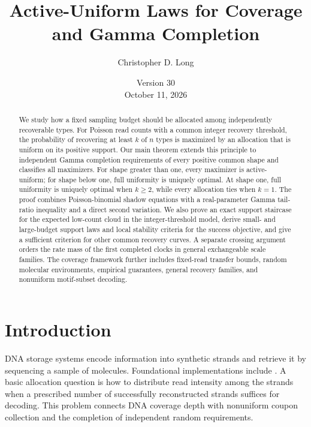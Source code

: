 \documentclass[11pt]{article}
\title{Active-Uniform Laws for Coverage and Gamma Completion}
\author{Christopher D. Long}
\date{Version 30\\October 11, 2026}
\theoremstyle{definition}
\theoremstyle{remark}
\newcommand{\1}{\mathbf 1}
\begin{document}
\maketitle

\begin{abstract}
We study how a fixed sampling budget should be allocated among independently recoverable types. For Poisson read counts with a common integer recovery threshold, the probability of recovering at least \(k\) of \(n\) types is maximized by an allocation that is uniform on its positive support. Our main theorem extends this principle to independent Gamma completion requirements of every positive common shape and classifies all maximizers. For shape greater than one, every maximizer is active-uniform; for shape below one, full uniformity is uniquely optimal. At shape one, full uniformity is uniquely optimal when \(k\ge2\), while every allocation ties when \(k=1\). The proof combines Poisson-binomial shadow equations with a real-parameter Gamma tail-ratio inequality and a direct second variation. We also prove an exact support staircase for the expected low-count cloud in the integer-threshold model, derive small- and large-budget support laws and local stability criteria for the success objective, and give a sufficient criterion for other common recovery curves. A separate crossing argument orders the rate mass of the first completed clocks in general exchangeable scale families. The coverage framework further includes fixed-read transfer bounds, random molecular environments, empirical guarantees, general recovery families, and nonuniform motif-subset decoding.

\end{abstract}

\clearpage
\begingroup\small
\tableofcontents
\endgroup
\clearpage

\section{Introduction}

DNA storage systems encode information into synthetic strands and retrieve it by sequencing a sample of molecules. Foundational implementations include \cite{ChurchGaoKosuri2012,Goldman2013,YazdiGabrysMilenkovic2017,Organick2018}. A basic allocation question is how to distribute read intensity among the strands when a prescribed number of successfully reconstructed strands suffices for decoding. This problem connects DNA coverage depth with nonuniform coupon collection and the completion of independent random requirements.
\end{document}
